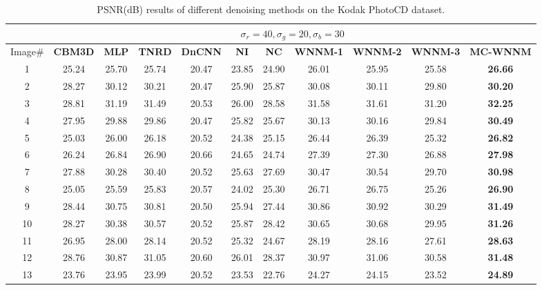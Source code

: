 \documentclass[10pt,onecolumn,letterpaper]{article}
\begin{document}
\begin{table}
\vspace{0mm}
\caption{PSNR(dB) results of different denoising methods on the Kodak PhotoCD dataset.}
\label{t1}
\label{taba}
\begin{center}
\renewcommand\arraystretch{1.0}
\footnotesize
\begin{tabular}{|c||c|c|c|c|c|c|c|c|c|c|}
\hline
&\multicolumn{10}{c|}{ $\sigma_{r} = 40, \sigma_{g} = 20, \sigma_{b} = 30$}
\\
\hline
\hline
Image\#
&
\textbf{CBM3D} \cite{cbm3d}
&
\textbf{MLP} \cite{mlp}
&
\textbf{TNRD} \cite{chen2015learning}
&
\textbf{DnCNN} \cite{dncnn}
&
\textbf{NI} \cite{neatimage}
&
\textbf{NC} \cite{noiseclinic}
&
\textbf{WNNM-1} \cite{wnnm}
&
\textbf{WNNM-2}
&
\textbf{WNNM-3}
&
\textbf{MC-WNNM}
\\
\hline
1 & 25.24 & 25.70 & 25.74 & 20.47 & 23.85 & 24.90 & 26.01 & 25.95 & 25.58 & \textbf{26.66}
\\
\hline
2 & 28.27 & 30.12 & 30.21 & 20.47 & 25.90 & 25.87 & 30.08 & 30.11 & 29.80 & \textbf{30.20} 
\\
\hline
3 & 28.81 & 31.19 & 31.49 & 20.53 & 26.00 & 28.58 & 31.58 & 31.61 & 31.20 & \textbf{32.25}  
\\
\hline 
4 & 27.95 & 29.88 & 29.86 & 20.47 & 25.82 & 25.67 & 30.13 & 30.16 & 29.84 & \textbf{30.49} 
\\
\hline
5 & 25.03 & 26.00 & 26.18 & 20.52 & 24.38 & 25.15 & 26.44 & 26.39 & 25.32 & \textbf{26.82}
\\
\hline
6 & 26.24 & 26.84 & 26.90 & 20.66 & 24.65 & 24.74 & 27.39 & 27.30 & 26.88 & \textbf{27.98} 
\\
\hline
7 & 27.88 & 30.28 & 30.40 & 20.52 & 25.63 & 27.69 & 30.47 & 30.54 & 29.70 & \textbf{30.98} 
\\
\hline
8 & 25.05 & 25.59 & 25.83 & 20.57 & 24.02 & 25.30 & 26.71 & 26.75 & 25.26 & \textbf{26.90}
\\
\hline
9 & 28.44 & 30.75 & 30.81 & 20.50 & 25.94 & 27.44 & 30.86 & 30.92 & 30.29 & \textbf{31.49}
\\
\hline
10& 28.27 & 30.38 & 30.57 & 20.52 & 25.87 & 28.42 & 30.65 & 30.68 & 29.95 & \textbf{31.26}
\\
\hline
11& 26.95 & 28.00 & 28.14 & 20.52 & 25.32 & 24.67 & 28.19 & 28.16 & 27.61 & \textbf{28.63}
\\
\hline
12& 28.76 & 30.87 & 31.05 & 20.60 & 26.01 & 28.37 & 30.97 & 31.06 & 30.58 & \textbf{31.48}
\\
\hline
13& 23.76 & 23.95 & 23.99 & 20.52 & 23.53 & 22.76 & 24.27 & 24.15 & 23.52 & \textbf{24.89}

\end{tabular}
\end{center}
\end{table}
\end{document}
